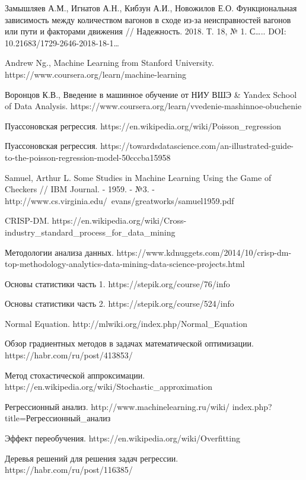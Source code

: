 \begin{thebibliography}{00}
    
     Замышляев А.М., Игнатов А.Н., Кибзун А.И., Новожилов Е.О. Функциональная зависимость между количеством вагонов в сходе из-за неисправностей вагонов или пути и факторами движения // Надежность. 2018. Т. 18, № 1. С….. DOI: 10.21683/1729-2646-2018-18-1…
    
     Andrew Ng., Machine Learning from Stanford University. https://www.coursera.org/learn/machine-learning
    
     Воронцов К.В., Введение в машинное обучение от НИУ ВШЭ \& Yandex School of Data Analysis. https://www.coursera.org/learn/vvedenie-mashinnoe-obuchenie
    
     Пуассоновская регрессия. https://en.wikipedia.org/wiki/Poisson\_regression
    
     Пуассоновская регрессия. https://towardsdatascience.com/an-illustrated-guide-to-the-poisson-regression-model-50cccba15958
    
     Samuel, Arthur L. Some Studies in Machine Learning Using the Game of Checkers // IBM Journal. - 1959. - №3. - http://www.cs.virginia.edu/~evans/greatworks/samuel1959.pdf
    
     CRISP-DM. https://en.wikipedia.org/wiki/Cross-industry\_standard\_process\_for\_data\_mining
    
     Методологии анализа данных. https://www.kdnuggets.com/2014/10/crisp-dm-top-methodology-analytics-data-mining-data-science-projects.html
    
     Основы статистики часть 1. https://stepik.org/course/76/info
    
     Основы статистики часть 2. https://stepik.org/course/524/info
    
     Normal Equation. http://mlwiki.org/index.php/Normal\_Equation
    
     Обзор градиентных методов в задачах математической оптимизации. https://habr.com/ru/post/413853/
    
     Метод стохастической аппроксимации. https://en.wikipedia.org/wiki/Stochastic\_approximation
    
     Регрессионный анализ. http://www.machinelearning.ru/wiki/ index.php?title=Регрессионный\_анализ
    
     Эффект переобучения. https://en.wikipedia.org/wiki/Overfitting
    
     Деревья решений для решения задач регрессии. https://habr.com/ru/post/116385/ 
    
\end{thebibliography}
